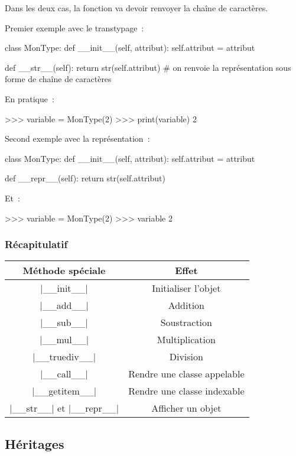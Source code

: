 		Dans les deux cas, la fonction va devoir renvoyer la chaîne de caractères.
		
		Premier exemple avec le transtypage~:
		\begin{pythoncode}
			class MonType:
				def __init__(self, attribut):
					self.attribut = attribut
				
				def __str__(self):
					return str(self.attribut) # on renvoie la représentation sous forme de chaîne de caractères
		\end{pythoncode}
		En pratique~:
		\begin{pythoncode}
			>>> variable = MonType(2)
			>>> print(variable)
			2
		\end{pythoncode}
		
		Second exemple avec la représentation~:
		\begin{pythoncode}
			class MonType:
				def __init__(self, attribut):
					self.attribut = attribut
				
				def __repr__(self):
					return str(self.attribut)
		\end{pythoncode}
		Et~:
		\begin{pythoncode}
			>>> variable = MonType(2)
			>>> variable
			2
		\end{pythoncode}
		
		\subsubsection{Récapitulatif}
			
		\begin{tabular}{|c|c|} \hline
			Méthode spéciale & Effet \\ \hline \hline
			\python|__init__| & Initialiser l'objet \\ \hline
			\python|__add__| & Addition \\ \hline
			\python|__sub__| & Soustraction \\ \hline
			\python|__mul__| & Multiplication \\ \hline
			\python|__truediv__| & Division \\ \hline
			\python|__call__| & Rendre une classe appelable \\ \hline
			\python|__getitem__| & Rendre une classe indexable\\ \hline
			\python|__str__| et \python|__repr__| & Afficher un objet \\ \hline
		\end{tabular}
	
	\subsection{Héritages}
		
